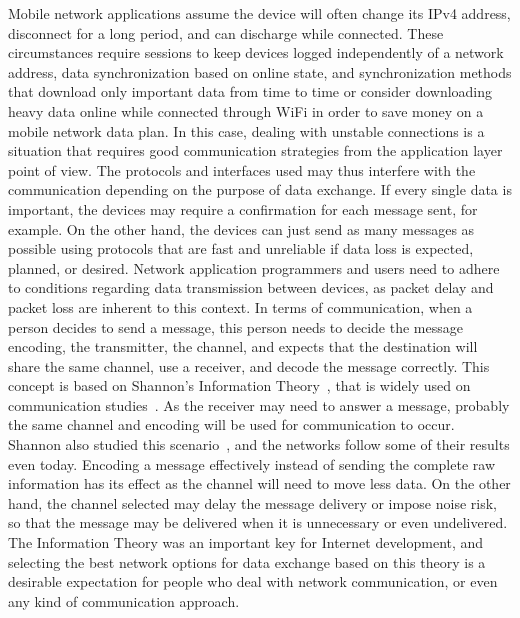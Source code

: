 Mobile network applications assume the device will often change its IPv4 address, disconnect for a long period, and can discharge while connected.
These circumstances require sessions to keep devices logged independently of a network address, data synchronization based on online state, and synchronization methods that download only important data from time to time or consider downloading heavy data online while connected through WiFi in order to save money on a mobile network data plan.
In this case, dealing with unstable connections is a situation that requires good communication strategies from the application layer point of view.
The protocols and interfaces used may thus interfere with the communication depending on the purpose of data exchange.
If every single data is important, the devices may require a confirmation for each message sent, for example.
On the other hand, the devices can just send as many messages as possible using protocols that are fast and unreliable if data loss is expected, planned, or desired.
Network application programmers and users need to adhere to conditions regarding data transmission between devices, as packet delay and packet loss are inherent to this context.
In terms of communication, when a person decides to send a message, this person needs to decide the message encoding, the transmitter, the channel, and expects that the destination will share the same channel, use a receiver, and decode the message correctly.
This concept is based on Shannon's Information Theory~\citep{Shannon1948mathematical}, that is widely used on communication studies~\citep{Fiske2010introduction}.
As the receiver may need to answer a message, probably the same channel and encoding will be used for communication to occur.
Shannon also studied this scenario~\citep{Shannon1961two}, and the networks follow some of their results even today.
Encoding a message effectively instead of sending the complete raw information has its effect as the channel will need to move less data.
On the other hand, the channel selected may delay the message delivery or impose noise risk, so that the message may be delivered when it is unnecessary or even undelivered.
The Information Theory was an important key for Internet development, and selecting the best network options for data exchange based on this theory is a desirable expectation for people who deal with network communication, or even any kind of communication approach.

